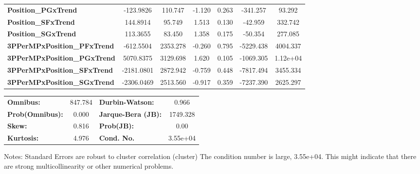 \begin{center}
\begin{tabular}{lcccccc}
\textbf{Position\_PGxTrend}         &    -123.9826  &      110.747     &    -1.120  &         0.263        &     -341.257    &       93.292     \\
\textbf{Position\_SFxTrend}         &     144.8914  &       95.749     &     1.513  &         0.130        &      -42.959    &      332.742     \\
\textbf{Position\_SGxTrend}         &     113.3655  &       83.450     &     1.358  &         0.175        &      -50.354    &      277.085     \\
\textbf{3PPerMPxPosition\_PFxTrend} &    -612.5504  &     2353.278     &    -0.260  &         0.795        &    -5229.438    &     4004.337     \\
\textbf{3PPerMPxPosition\_PGxTrend} &    5070.8375  &     3129.698     &     1.620  &         0.105        &    -1069.305    &     1.12e+04     \\
\textbf{3PPerMPxPosition\_SFxTrend} &   -2181.0801  &     2872.942     &    -0.759  &         0.448        &    -7817.494    &     3455.334     \\
\textbf{3PPerMPxPosition\_SGxTrend} &   -2306.0469  &     2513.560     &    -0.917  &         0.359        &    -7237.390    &     2625.297     \\
\bottomrule
\end{tabular}
\begin{tabular}{lclc}
\textbf{Omnibus:}       & 847.784 & \textbf{  Durbin-Watson:     } &    0.966  \\
\textbf{Prob(Omnibus):} &   0.000 & \textbf{  Jarque-Bera (JB):  } & 1749.328  \\
\textbf{Skew:}          &   0.816 & \textbf{  Prob(JB):          } &     0.00  \\
\textbf{Kurtosis:}      &   4.976 & \textbf{  Cond. No.          } & 3.55e+04  \\
\bottomrule
\end{tabular}
\end{center}

Notes: \newline
 [1] Standard Errors are robust to cluster correlation (cluster) \newline
 [2] The condition number is large, 3.55e+04. This might indicate that there are \newline
 strong multicollinearity or other numerical problems.